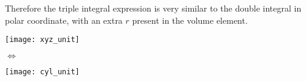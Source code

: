 \documentclass[class=article, crop=false, 12pt]{standalone}
\begin{document}
Therefore the triple integral expression is very similar to the double integral in polar coordinate,
with an extra $r$ present in the volume element.

\begin{center}
    \begin{minipage}{0.3\textwidth}
        \centering
        \texttt{[image: xyz\_unit]}
    \end{minipage}
    $\Leftrightarrow$
    \begin{minipage}{0.3\textwidth}
        \centering
        \texttt{[image: cyl\_unit]}
    \end{minipage}
\end{center}
\end{document}
